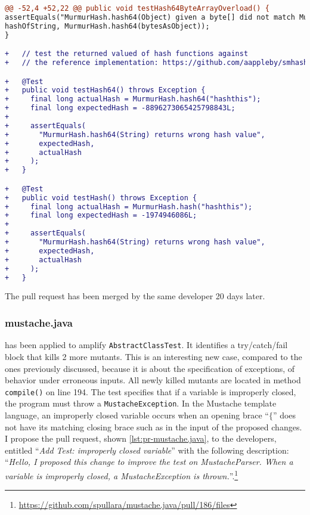 \begin{lstlisting}[float,language=diff,caption=Test-improvement proposed to stream-lib developers with developers' suggestions.,label=lst:pr-stream-lib-2]
@@ -52,4 +52,22 @@ public void testHash64ByteArrayOverload() {
assertEquals("MurmurHash.hash64(Object) given a byte[] did not match MurmurHash.hash64(String)",
hashOfString, MurmurHash.hash64(bytesAsObject));
}

+   // test the returned valued of hash functions against
+   // the reference implementation: https://github.com/aappleby/smhasher.git

+   @Test
+   public void testHash64() throws Exception {
+     final long actualHash = MurmurHash.hash64("hashthis");
+     final long expectedHash = -8896273065425798843L;
+
+     assertEquals(
+       "MurmurHash.hash64(String) returns wrong hash value",
+       expectedHash,
+       actualHash
+     );
+   }

+   @Test
+   public void testHash() throws Exception {
+     final long actualHash = MurmurHash.hash("hashthis");
+     final long expectedHash = -1974946086L;
+
+     assertEquals(
+       "MurmurHash.hash64(String) returns wrong hash value",
+       expectedHash,
+       actualHash
+     );
+   }
\end{lstlisting}

The pull request has been merged by the same developer 20 days later.

\subsubsection{mustache.java}
\label{subsubsec:test-improvement:experiment-results:rq1:mustache}

\dspot has been applied to amplify \texttt{AbstractClassTest}. 
It identifies a try/catch/fail block that kills 2 more mutants.
This is an interesting new case, compared to the ones previously discussed, because it is about the specification of exceptions, \ie of behavior under erroneous inputs.
All newly killed mutants are located in method \texttt{compile()} on line 194.
The test specifies that if a variable is improperly closed, the program must throw a \texttt{MustacheException}. 
In the Mustache template language, an improperly closed variable occurs when an opening brace ``$\{$'' does not have its matching closing brace such as in the input of the proposed changes. 
I propose the pull request, shown \autoref{lst:pr-mustache.java}, to the developers, entitled ``\emph{Add Test: improperly closed variable}'' with the following description: ``\emph{Hello, I proposed this change to improve the test on MustacheParser. When a variable is improperly closed, a MustacheException is thrown.}''.\footnote{\url{https://github.com/spullara/mustache.java/pull/186/files}}

